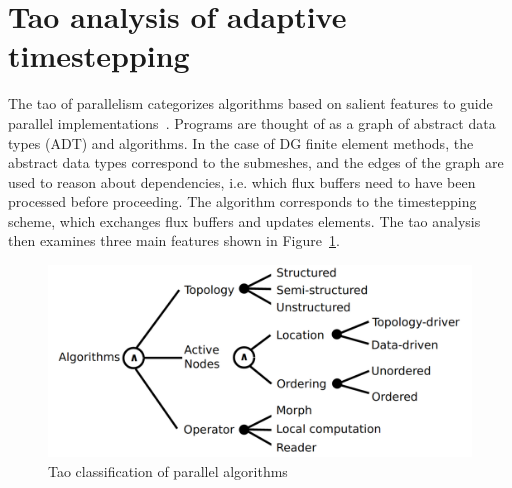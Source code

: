

\section{Tao analysis of adaptive timestepping}
The tao of parallelism categorizes algorithms based on salient features to guide parallel implementations~\cite{Pingali2011}. Programs are thought of as a graph of abstract data types (ADT) and algorithms. In the case of DG finite element methods, the abstract data types correspond to the submeshes, and the edges of the graph are used to reason about dependencies, i.e. which flux buffers need to have been processed before proceeding. The algorithm corresponds to the timestepping scheme, which exchanges flux buffers and updates elements.
The tao analysis then examines three main features shown in Figure~\ref{fig:tao-analysis}.

\begin{figure}
\centering
\includegraphics[height=0.25 \textheight]{work_estimate_storm36/tao.png}
\caption{Tao classification of parallel algorithms\cite{Pingali2011}}
\label{fig:tao-analysis}
\end{figure}

